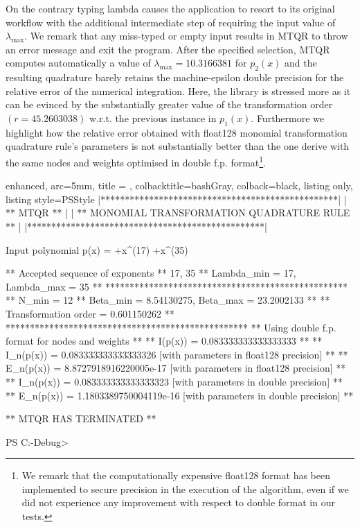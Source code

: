 \documentclass[a4paper, twosided]{book}
\begin{document}
\noindent
On the contrary typing \colorbox{poliGrayBlue}{lambda} causes the application to resort to its original workflow with the additional intermediate step of requiring the input value of $\lambda_{\text{max}}$. We remark that any miss-typed or empty input results in MTQR to throw an error message and exit the program. After the specified selection, MTQR computes automatically a value of $\lambda_{\text{max}} = 10.3166381$ for $p_2(x)$ and the resulting quadrature barely retains the machine-epsilon double precision for the relative error of the numerical integration. Here, the library is stressed more as it can be evinced by the substantially greater value of the transformation order $(r=45.2603038)$ w.r.t. the previous instance in $p_1(x)$. Furthermore we highlight how the relative error obtained with \colorbox{poliGrayBlue}{float128} monomial transformation quadrature rule's parameters is not substantially better than the one derive with the same nodes and weights optimised in double f.p. format\footnote{We remark that the computationally expensive \colorbox{poliGrayBlue}{float128} format has been implemented to secure precision in the execution of the algorithm, even if we did not experience any improvement with respect to double format in our tests.\vspace{-2ex}}.

\vspace{0.1cm}
\begin{tcblisting}{enhanced,
                   arc=5mm,
                   title = \color{black}{\large \ttfamily Executing the driver test case: p\_3(x)},
                   colbacktitle=bashGray,
                   colback=black,
                   listing only,
                   listing style=PSStyle}
    |*************************************************|
    |                 ** MTQR **                      |
    |  ** MONOMIAL TRANSFORMATION QUADRATURE RULE **  |
    |*************************************************|
    
Input polynomial p(x) =  +x^(17)  +x^(35) 

 ** Accepted sequence of exponents ** 
    {17, 35}
 ** Lambda_min = 17, Lambda_max = 35 **
 **************************************************
 ** N_min = 12
 ** Beta_min = 8.54130275, Beta_max = 23.2002133 **
 ** Transformation order = 0.601150262 **
 **************************************************
 ** Using double f.p. format for nodes and weights **
 ** I(p(x))   = 0.083333333333333333 **
 ** I_n(p(x)) = 0.083333333333333326    [with parameters in float128 precision] **
 ** E_n(p(x)) = 8.8727918916220005e-17  [with parameters in float128 precision] **
 ** I_n(p(x)) = 0.083333333333333323    [with parameters in double precision] **
 ** E_n(p(x)) = 1.1803389750004119e-16  [with parameters in double precision] **

 ** MTQR HAS TERMINATED **

PS C:\MTQR\out\build{}-Debug> 
\end{tcblisting}
\end{document}
